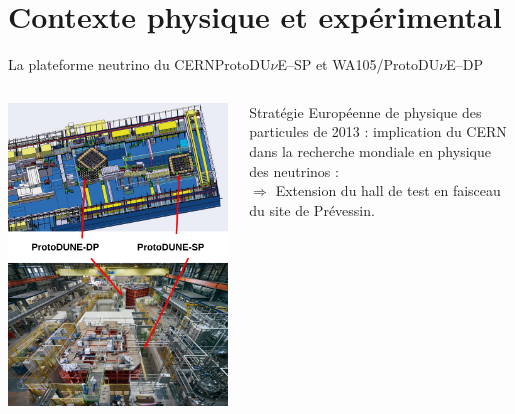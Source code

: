   \section[Contexte]{Contexte physique et expérimental}
    
    \begin{frame}{La plateforme neutrino du CERN}{ProtoDU$\nu$E--SP et WA105/ProtoDU$\nu$E--DP}
        \begin{columns}
            \begin{column}{0.5\textwidth}
                \includegraphics[height=0.9\textheight]{./pictures/neutrino_platform.png}
            \end{column}
            \begin{column}{0.5\textwidth}
                \begin{scriptsize}
                    Stratégie Européenne de physique des particules de 2013 : implication du CERN dans la recherche mondiale en physique des neutrinos : \\ $\Rightarrow$ Extension du hall de test en faisceau du site de Prévessin.\vspace{0.4cm}

\end{scriptsize}
\end{column}
\end{columns}
\end{frame}
